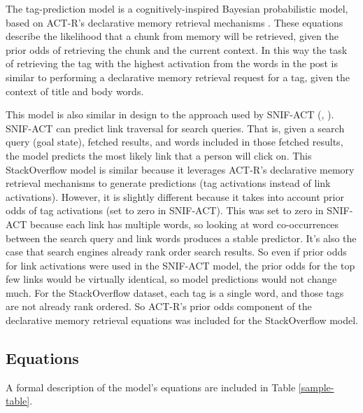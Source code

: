 \documentclass[10pt,letterpaper]{article}
\begin{document}
The tag-prediction model is a cognitively-inspired Bayesian probabilistic model, based on ACT-R's declarative memory retrieval mechanisms \cite{Anderson2004}.
These equations describe the likelihood that a chunk from memory will be retrieved, given the prior odds of retrieving the chunk and the current context.
In this way the task of retrieving the tag with the highest activation from the words in the post is similar to performing a declarative memory retrieval request for a tag, given the context of title and body words.

This model is also similar in design to the approach used by SNIF-ACT (, ). 
SNIF-ACT can predict link traversal for search queries.
That is, given a search query (goal state), fetched results, and words included in those fetched results, the model predicts the most likely link that a person will click on.
This StackOverflow model is similar because it leverages ACT-R's declarative memory retrieval mechanisms to generate predictions (tag activations instead of link activations).
However, it is slightly different because it takes into account prior odds of tag activations (set to zero in SNIF-ACT).
This was set to zero in SNIF-ACT because each link has multiple words, so looking at word co-occurrences between the search query and link words produces a stable predictor.
It's also the case that search engines already rank order search results.
So even if prior odds for link activations were used in the SNIF-ACT model, the prior odds for the top few links would be virtually identical, so model predictions would not change much.
For the StackOverflow dataset, each tag is a single word, and those tags are not already rank ordered.
So ACT-R's prior odds component of the declarative memory retrieval equations was included for the StackOverflow model.

\subsection{Equations}

A formal description of the model's equations are included in Table \ref{sample-table}. 
\end{document}
